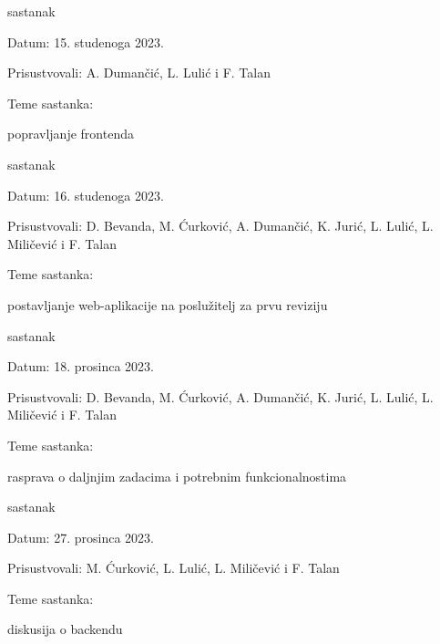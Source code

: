 \begin{packed_enum}
			\item  sastanak
			\item[] \begin{packed_item}
				\item Datum: 15. studenoga 2023.
				\item Prisustvovali: A. Dumančić, L. Lulić i F. Talan
				\item Teme sastanka:
				\begin{packed_item}
					\item popravljanje frontenda
				\end{packed_item}
			\end{packed_item}

			\item  sastanak
			\item[] \begin{packed_item}
				\item Datum: 16. studenoga 2023.
				\item Prisustvovali: D. Bevanda, M. Ćurković, A. Dumančić, K. Jurić, L. Lulić, L. Miličević i F. Talan
				\item Teme sastanka:
				\begin{packed_item}
					\item postavljanje web-aplikacije na poslužitelj za prvu reviziju
				\end{packed_item}
			\end{packed_item}
			
			\item  sastanak
			\item[] \begin{packed_item}
				\item Datum: 18. prosinca 2023.
				\item Prisustvovali: D. Bevanda, M. Ćurković, A. Dumančić, K. Jurić, L. Lulić, L. Miličević i F. Talan
				\item Teme sastanka:
				\begin{packed_item}
					\item rasprava o daljnjim zadacima i potrebnim funkcionalnostima
				\end{packed_item}
			\end{packed_item}
			
			\item  sastanak
			\item[] \begin{packed_item}
				\item Datum: 27. prosinca 2023.
				\item Prisustvovali: M. Ćurković, L. Lulić, L. Miličević i F. Talan
				\item Teme sastanka:
				\begin{packed_item}
					\item diskusija o backendu
				\end{packed_item}
			\end{packed_item}
			

\end{packed_enum}

